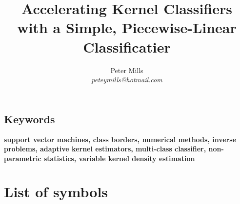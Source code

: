 \documentclass[11pt]{article}
\begin{document}
\title{Accelerating Kernel Classifiers with a Simple, Piecewise-Linear Classificatier}

\author{Peter Mills\\\textit{peteymills@hotmail.com}}

\maketitle



\begin{abstract}
	
\end{abstract}

\subsection*{Keywords}
\textbf{support vector machines, 
	class borders,
numerical methods, 
inverse problems,
adaptive kernel estimators, 
multi-class classifier, 
non-parametric statistics, 
variable kernel density estimation}

\tableofcontents

\section*{List of symbols}


{\small
  
}



\appendix



\newpage



\end{document}
